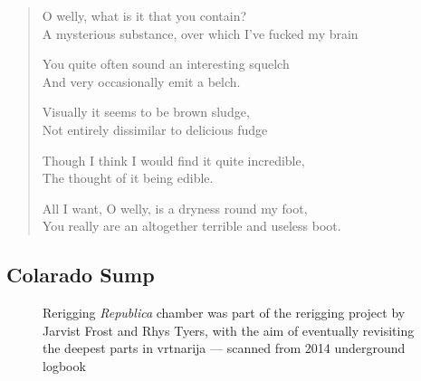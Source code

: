 \begin{verse}
\begin{centering}
 O welly, what is it that you contain?\\
A mysterious substance, over which I’ve fucked my brain

You quite often sound an interesting squelch\\
And very occasionally emit a belch.

Visually it seems to be brown sludge,\\
Not entirely dissimilar to delicious fudge

Though I think I would find it quite incredible,\\
The thought of it being edible.

All I want, O welly, is a dryness round my foot, \\
You really are an altogether terrible and useless boot.\\
 \end{centering}
\end{verse}

\subsection{Colarado Sump}
\begin{marginfigure}
\end{marginfigure}


\begin{figure*}[t]
	\checkoddpage \ifoddpage \forcerectofloat \else \forceversofloat \fi
    		\centering
    
   		\caption{Rerigging \emph{Republica} chamber was part of the rerigging project by Jarvist Frost and Rhys Tyers, with the aim of eventually revisiting the deepest parts in vrtnarija
    		 --- scanned from 2014 underground logbook}
		 \label{scan}
\end{figure*}
          

